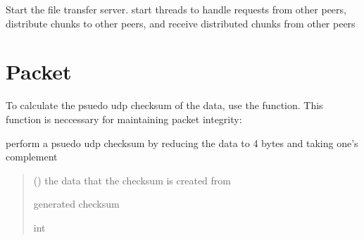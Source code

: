 \documentclass[letterpaper,10pt,english,openany,oneside]{sphinxmanual}
\begin{document}
\begin{fulllineitems}
\begin{fulllineitems}
\begin{quote}
\begin{description}
\begin{itemize}
\end{itemize}

\end{description}\end{quote}

\end{fulllineitems}


\begin{fulllineitems}
\label{\detokenize{index:transfer.FileTransfer.start_server}}
\pysigstartsignatures
\pysiglinewithargsret
{}
{}
{}
\pysigstopsignatures
\sphinxAtStartPar
Start the file transfer server. start threads to handle requests from other peers, distribute chunks to other
peers, and receive distributed chunks from other peers

\end{fulllineitems}


\end{fulllineitems}



\chapter{Packet}
\label{\detokenize{index:packet}}
\sphinxAtStartPar
To calculate the psuedo udp checksum of the data, use the  function. This
function is neccessary for maintaining packet integrity:

\begin{fulllineitems}
\label{\detokenize{index:packet.udp_checksum}}
\pysigstartsignatures
\pysiglinewithargsret
{}
{}
{}
\pysigstopsignatures
\sphinxAtStartPar
perform a psuedo udp checksum by reducing the data to 4 bytes and taking one’s complement
\begin{quote}\begin{description}
\sphinxAtStartPar
{} () \textendash{} the data that the checksum is created from

\sphinxAtStartPar
generated checksum

\sphinxAtStartPar
int

\end{description}\end{quote}

\end{fulllineitems}
\end{document}

